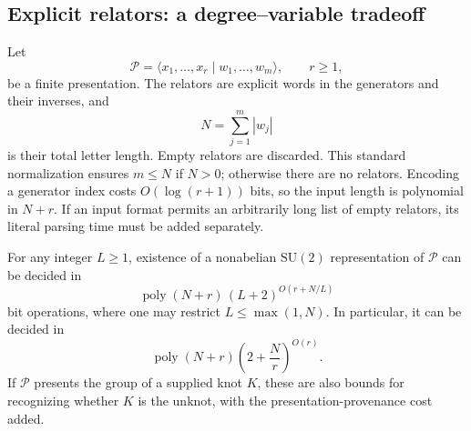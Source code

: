 \subsection{Explicit relators: a degree--variable tradeoff}

Let
\[
 \mathcal P=\langle x_1,\ldots,x_r\mid w_1,\ldots,w_m\rangle,
 \qquad r\geq 1,
\]
be a finite presentation.  The relators are explicit words in the generators
and their inverses, and
\[
 N=\sum_{j=1}^m |w_j|
\]
is their total letter length.  Empty relators are discarded.  This standard
normalization ensures $m\leq N$ if $N>0$; otherwise there are no relators.
Encoding a generator index costs $O(\log(r+1))$ bits, so the input length
is polynomial in $N+r$.  If an input format permits an arbitrarily long
list of empty relators, its literal parsing time must be added separately.

\begin{theorem}
\label{thm:su2-explicit-tradeoff}
For any integer $L\geq 1$, existence of a nonabelian $\mathrm{SU}(2)$
representation of $\mathcal P$ can be decided in
\begin{equation}
 \operatorname{poly}(N+r)\,(L+2)^{O(r+N/L)}
 \label{eq:su2-explicit-tradeoff}
\end{equation}
bit operations, where one may restrict $L\leq\max(1,N)$.
In particular, it can be decided in
\begin{equation}
 \operatorname{poly}(N+r)
 \left(2+\frac{N}{r}\right)^{O(r)}.
 \label{eq:su2-explicit-optimized}
\end{equation}
If $\mathcal P$ presents the group of a supplied knot $K$, these are
also bounds for recognizing whether $K$ is the unknot, with the
presentation-provenance cost added.
\end{theorem}


